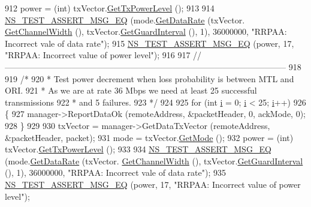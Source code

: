 \begin{DoxyCode}
912   power = (int) txVector.\hyperlink{classns3_1_1WifiTxVector_a7c98bd9609ff1c5cefa6e22d6908a2fe}{GetTxPowerLevel} ();
913 
914   \hyperlink{group__testing_ga2a9d78cffb3db8e867c35fff0b698cf5}{NS\_TEST\_ASSERT\_MSG\_EQ} (mode.\hyperlink{classns3_1_1WifiMode_adcfbe150f69da720db23387f733b8a52}{GetDataRate} (txVector.
      \hyperlink{classns3_1_1WifiTxVector_a1f8bfa51778a3e217581eb665f059564}{GetChannelWidth} (), txVector.\hyperlink{classns3_1_1WifiTxVector_ab80c0fd812542ef337a6cace4f64db63}{GetGuardInterval} (), 1), 36000000, \textcolor{stringliteral}{"RRPAA:
       Incorrect vale of data rate"});
915   \hyperlink{group__testing_ga2a9d78cffb3db8e867c35fff0b698cf5}{NS\_TEST\_ASSERT\_MSG\_EQ} (power, 17, \textcolor{stringliteral}{"RRPAA: Incorrect value of power level"});
916 
917   \textcolor{comment}{//-----------------------------------------------------------------------------------------------------}
918 
919   \textcolor{comment}{/*}
920 \textcolor{comment}{   * Test power decrement when loss probability is between MTL and ORI.}
921 \textcolor{comment}{   * As we are at rate 36 Mbps we need at least 25 successful transmissions}
922 \textcolor{comment}{   * and 5 failures.}
923 \textcolor{comment}{   */}
924 
925   \textcolor{keywordflow}{for} (\textcolor{keywordtype}{int} \hyperlink{bernuolliDistribution_8m_a6f6ccfcf58b31cb6412107d9d5281426}{i} = 0; \hyperlink{bernuolliDistribution_8m_a6f6ccfcf58b31cb6412107d9d5281426}{i} < 25; \hyperlink{bernuolliDistribution_8m_a6f6ccfcf58b31cb6412107d9d5281426}{i}++)
926     \{
927       manager->ReportDataOk (remoteAddress, &packetHeader, 0, ackMode, 0);
928     \}
929 
930   txVector = manager->GetDataTxVector (remoteAddress, &packetHeader, packet);
931   mode = txVector.\hyperlink{classns3_1_1WifiTxVector_a497b1f11cad4b8b26251dfa07c9ad1d6}{GetMode} ();
932   power = (int) txVector.\hyperlink{classns3_1_1WifiTxVector_a7c98bd9609ff1c5cefa6e22d6908a2fe}{GetTxPowerLevel} ();
933 
934   \hyperlink{group__testing_ga2a9d78cffb3db8e867c35fff0b698cf5}{NS\_TEST\_ASSERT\_MSG\_EQ} (mode.\hyperlink{classns3_1_1WifiMode_adcfbe150f69da720db23387f733b8a52}{GetDataRate} (txVector.
      \hyperlink{classns3_1_1WifiTxVector_a1f8bfa51778a3e217581eb665f059564}{GetChannelWidth} (), txVector.\hyperlink{classns3_1_1WifiTxVector_ab80c0fd812542ef337a6cace4f64db63}{GetGuardInterval} (), 1), 36000000, \textcolor{stringliteral}{"RRPAA:
       Incorrect vale of data rate"});
935   \hyperlink{group__testing_ga2a9d78cffb3db8e867c35fff0b698cf5}{NS\_TEST\_ASSERT\_MSG\_EQ} (power, 17, \textcolor{stringliteral}{"RRPAA: Incorrect value of power level"});

\end{DoxyCode}
